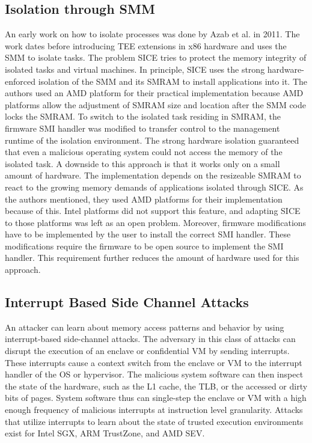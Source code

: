\subsection{Isolation through SMM}
\label{sec:20:isolation_smm}
An early work on how to isolate processes was done by Azab et al. in 2011.\cite{azab_sice_2011}
The work dates before introducing TEE extensions in x86 hardware and uses the SMM to isolate tasks. The problem
SICE tries to protect the memory integrity of isolated tasks and virtual machines.
In principle, SICE uses the strong hardware-enforced
isolation of the SMM and its SMRAM to install applications into it. The authors used an AMD platform for
their practical implementation because AMD platforms allow the adjustment of SMRAM size and location after the SMM code
locks the SMRAM.\cite{bios2014amd} To switch
to the isolated task residing in SMRAM, the firmware SMI handler was modified to transfer control to the
management runtime of the isolation environment. The strong hardware isolation guaranteed that even a malicious
operating system could not access the memory of the isolated task. A downside to this approach is that it works only on
a small amount of hardware. The implementation depends on the resizeable SMRAM to react to the growing
memory demands of applications isolated through SICE. As the authors mentioned, they used AMD platforms for their
implementation because of this. Intel platforms did not support this feature, and adapting SICE to those platforms
was left as an open problem. Moreover, firmware modifications have to be implemented by the user to install the correct
SMI handler. These modifications require the firmware to be open source to implement the SMI handler. This requirement
further reduces the amount of hardware used for this approach.

\subsection{Interrupt Based Side Channel Attacks}
\label{sec:20:interrupt_sca}
An attacker can learn about memory access patterns and behavior by using interrupt-based side-channel attacks. The
adversary in this class of attacks can disrupt the execution of an enclave or confidential VM by sending
interrupts. These interrupts cause a context switch from the enclave or VM to the interrupt handler of the OS or
hypervisor. The malicious system software can then inspect the state of the hardware, such as the L1 cache, the TLB, or
the accessed or dirty bits of pages. System software thus can single-step the enclave or VM with a high enough frequency
of malicious interrupts at instruction level granularity. Attacks that utilize interrupts to learn about the state of
trusted execution environments exist for Intel SGX, ARM TrustZone, and AMD SEV.\cite{van2017sgx, kou2021load, wilke2023sev}

